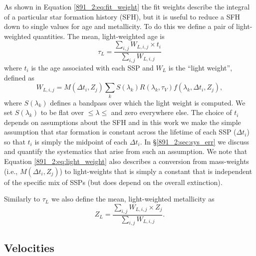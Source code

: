 As shown in Equation \ref{891_2:eq:fit_weight} the fit weights describe the
integral of a particular star formation history (SFH), but it is
useful to reduce a SFH down to single values for age and
metallicity. To do this we define a pair of light-weighted
quantities. The mean, light-weighted age is
\begin{equation}
\label{891_2:eq:MLWA}
\tau_L = \frac{\sum_{i,j} W_{L,i,j}\times t_i}{\sum_{i,j} W_{L,i,j}}
\end{equation}
where $t_i$ is the age associated with each SSP and $W_L$ is the
``light weight'', defined as
\begin{equation}
\label{891_2:eq:light_weight}
W_{L,i,j} = M(\Delta t_i,Z_j)\sum_k S(\lambda_k) R(\lambda_k, \tau_V)
f(\lambda_k, \Delta t_i, Z_j),
\end{equation}
where $S(\lambda_k)$ defines a bandpass over which the light weight is
computed. We set $S(\lambda_k)$ to be flat over 
$\leq\lambda\leq$  and zero everywhere else. The choice
of $t_i$ depends on assumptions about the SFH and in this work we make
the simple assumption that star formation is constant across the
lifetime of each SSP ($\Delta t_i$) so that $t_i$ is simply the
midpoint of each $\Delta t_i$. In \S\ref{891_2:sec:sys_err} we discuss
and quantify the systematics that arise from such an assumption. We
note that Equation \ref{891_2:eq:light_weight} also describes a
conversion from mass-weights (i.e., $M(\Delta t_i, Z_j)$) to
light-weights that is simply a constant that is independent of the
specific mix of SSPs (but does depend on the overall extinction).

Similarly to $\tau_L$ we also define the mean, light-weighted
metallicity as
\begin{equation}
\label{891_2:eq:MLWZ}
Z_L = \frac{\sum_{i,j} W_{L,i,j}\times Z_j}{\sum_{i,j} W_{L,i,j}}.
\end{equation}


\subsection{Velocities}
\label{891_2:sec:vel}

